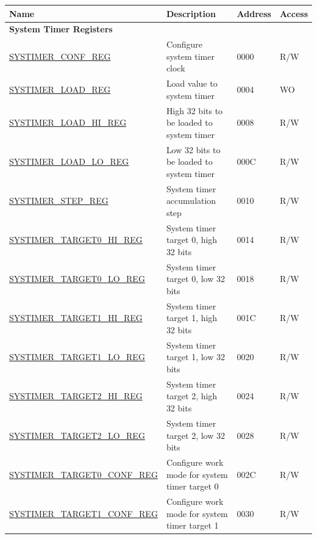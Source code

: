 \begin{longtable}{ | p{6cm} | p{7.2cm} | p{1.3cm} | p{1cm} | }
\hline\rowcolor{lightgray}
Name & Description &  Address & Access \\ \hline
\endhead

\multicolumn{4}{|l|}{\textbf{System Timer Registers}} \\ \hline
\hyperref[regdesc:SYSTIMERCONFREG]{SYSTIMER\_CONF\_REG} & Configure system timer clock & \hexprefix{}0000 & R/W \\ \hline
\hyperref[regdesc:SYSTIMERLOADREG]{SYSTIMER\_LOAD\_REG} & Load value to system timer & \hexprefix{}0004 & WO \\ \hline
\hyperref[regdesc:SYSTIMERLOADHIREG]{SYSTIMER\_LOAD\_HI\_REG} & High 32 bits to be loaded to system timer & \hexprefix{}0008 & R/W \\ \hline
\hyperref[regdesc:SYSTIMERLOADLOREG]{SYSTIMER\_LOAD\_LO\_REG} & Low 32 bits to be loaded to system timer & \hexprefix{}000C & R/W \\ \hline
\hyperref[regdesc:SYSTIMERSTEPREG]{SYSTIMER\_STEP\_REG} & System timer accumulation step & \hexprefix{}0010 & R/W \\ \hline
\hyperref[regdesc:SYSTIMERTARGET0HIREG]{SYSTIMER\_TARGET0\_HI\_REG} & System timer target 0, high 32 bits & \hexprefix{}0014 & R/W \\ \hline
\hyperref[regdesc:SYSTIMERTARGET0LOREG]{SYSTIMER\_TARGET0\_LO\_REG} & System timer target 0, low 32 bits & \hexprefix{}0018 & R/W \\ \hline
\hyperref[regdesc:SYSTIMERTARGET1HIREG]{SYSTIMER\_TARGET1\_HI\_REG} & System timer target 1, high 32 bits & \hexprefix{}001C & R/W \\ \hline
\hyperref[regdesc:SYSTIMERTARGET1LOREG]{SYSTIMER\_TARGET1\_LO\_REG} & System timer target 1, low 32 bits & \hexprefix{}0020 & R/W \\ \hline
\hyperref[regdesc:SYSTIMERTARGET2HIREG]{SYSTIMER\_TARGET2\_HI\_REG} & System timer target 2, high 32 bits & \hexprefix{}0024 & R/W \\ \hline
\hyperref[regdesc:SYSTIMERTARGET2LOREG]{SYSTIMER\_TARGET2\_LO\_REG} & System timer target 2, low 32 bits & \hexprefix{}0028 & R/W \\ \hline
\hyperref[regdesc:SYSTIMERTARGET0CONFREG]{SYSTIMER\_TARGET0\_CONF\_REG} & Configure work mode for system timer target 0 & \hexprefix{}002C & R/W \\ \hline
\hyperref[regdesc:SYSTIMERTARGET1CONFREG]{SYSTIMER\_TARGET1\_CONF\_REG} & Configure work mode for system timer target 1 & \hexprefix{}0030 & R/W \\ \hline

\end{longtable}
